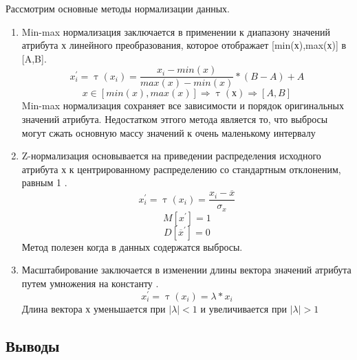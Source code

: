 Рассмотрим основные методы нормализации данных.
\begin{enumerate}
	\item Min-max нормализация заключается в применении к диапазону значений атрибута х линейного преобразования, которое отображает [min(х),max(х)] в [A,B].
	\begin{equation}
	\label{mixmaxNorm}
	x^\prime_i=\uptau(x_i)=\frac{x_i - min(x)}{max(x) - min(x)}*(B-A) + A
	\end{equation}
	\begin{equation}
	x \in[min(x), max(x)] \Rightarrow \uptau(х) \Rightarrow [A,B]
	\end{equation}
	Min-max нормализация сохраняет все зависимости и порядок оригинальных значений атрибута. Недостатком этгого метода является то, что выбросы могут сжать основную массу значений к очень маленькому интервалу
	\item Z-нормализация  основывается на приведении распределения исходного атрибута х  к центрированному распределению со стандартным отклоненим, равным 1 \cite{Book25} .
	\begin{equation}
	\label{ZNormalization}
	x^\prime_i=\uptau(x_i) =\frac{x_i - \overline{x}}{\sigma_x}
	\end{equation}
	\begin{equation}
	M[x^\prime]=1	 
	\end{equation}
	\begin{equation}
	D[\overline{x}^\prime]=0	 
	\end{equation}
	Метод полезен когда в данных содержатся выбросы.
	\item Масштабирование заключается в изменении длины вектора значений атрибута путем умножения на константу \cite{Book20} .
	\begin{equation}
	x^\prime_i=\uptau(x_i)=\lambda*x_i
	\end{equation}
	Длина вектора х уменьшается при $|\lambda|<1$ и увеличивается при $|\lambda|>1$ 
\end{enumerate}
\subsection{Выводы}

